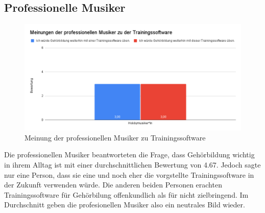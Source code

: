 \subsection*{Professionelle Musiker}
\begin{figure}[H]
    \centering
    \includegraphics[width=1\textwidth]{Bilder/eval-profis.png}
    \caption{Meinung der professionellen Musiker zu Trainingssoftware}
\end{figure}
Die professionellen Musiker beantworteten die Frage, dass Gehörbildung wichtig in ihrem Alltag ist mit einer durchschnittlichen Bewertung von 4.67. Jedoch sagte nur eine Person, dass sie eine und noch eher die vorgstellte Trainingssoftware in der Zukunft verwenden würde. Die anderen beiden Personen erachten Trainingssoftware für Gehörbilung offenkundlich als für nicht zielbringend. Im Durchschnitt geben die profesionellen Musiker also ein neutrales Bild wieder.

